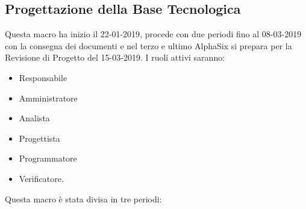         \subsection{Progettazione della Base Tecnologica}
        	Questa macro ha inizio il 22-01-2019, procede con due periodi fino al 08-03-2019 con la consegna dei documenti e nel
        terzo e ultimo AlphaSix si prepara per la Revisione di Progetto del 15-03-2019. I ruoli attivi saranno: 
        \begin{itemize}
            \item Responsabile
            \item Amministratore
            \item Analista
            \item Progettista
            \item Programmatore
            \item Verificatore.
        \end{itemize}
        Questa macro è stata divisa in tre periodi:
